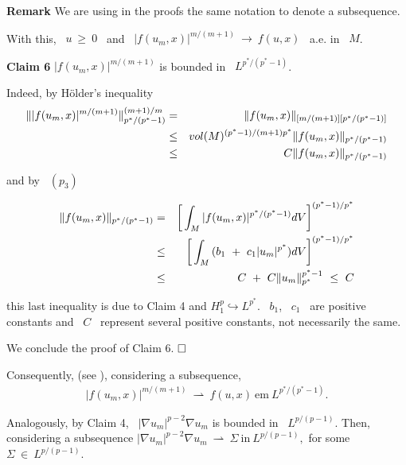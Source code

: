 \documentclass[12pt]{article}
\begin{document}
{\bf Remark}
We are using in the proofs the same notation to denote a subsequence.

With this, \ $u \ \geq \ 0$ \ and \ $|f(u_m,x)|^{m/(m+1)} \ \longrightarrow \ f(u,x)$ \ a.e. in \ $M$.

{\bf Claim 6}
$|f(u_m,x)|^{m/(m+1)}$ is bounded in \ $L^{p^{\ast}/(p^{\ast}-1)}$.

Indeed, by Hölder's inequality 
\vspace{-0.5mm}
\begin{eqnarray*}
{\displaystyle}\| |f(u_m,x)|^{m/(m+1)}\|^{(m+1)/m}_{p^{\ast}/(p^{\ast}-1)} & = & {\displaystyle}\| f(u_m,x)\|_{[m/(m+1)][p^{\ast}/(p^{\ast}-1)]} \\
 & \leq & vol(M)^{(p^{\ast} - 1)/(m + 1)p^{\ast}} {\displaystyle}\| f(u_m,x)\|_{p^{\ast}/(p^{\ast}-1)} \\
 & \leq & C {\displaystyle}\| f(u_m,x)\|_{p^{\ast}/(p^{\ast}-1)}
\end{eqnarray*} 

\noindent  and by \ $(p_3)$
\vspace{-1cm}

\begin{eqnarray*}
{\displaystyle}\| f(u_m,x)\|_{p^{\ast}/(p^{\ast}-1)} & = & \left[{\displaystyle}\int_M{|f(u_m,x)|^{p^{\ast}/(p^{\ast}-1)}dV}\right]^{(p^{\ast}-1)/p^{\ast}} \\
 & \leq & \left[{\displaystyle}\int_M{(b_1 \ + \ c_1|u_m|^{p^{\ast}})dV}\right]^{(p^{\ast}-1)/p^{\ast}} \\
 & \leq & C \ + \ C\|u_m\|^{p^{\ast}-1}_{p^{\ast}} \ \leq \ C
\end{eqnarray*}

\noindent  this last inequality is due to Claim 4 and  $H^p_1
  \hookrightarrow  L^{p^{\ast}}$. \ $b_1$, \ $c_1$ \ are  positive constants and \ $C$ \ represent several
 positive constants, not necessarily the same.

We conclude the proof of Claim 6. {$\hfill{\Box}$}
{\vspace{0.2cm}}

Consequently, (see \cite{aubin4}),  considering a subsequence, 
\vspace{-0.5mm}
\begin{eqnarray}
\label{2.10}
|f(u_m,x)|^{m/(m+1)} \ \rightharpoonup \ f(u,x) \ \mbox{em} \ L^{p^{\ast}/(p^{\ast}-1)}. 
\end{eqnarray}

Analogously, by Claim 4, \ $|\nabla u_m|^{p-2}\nabla u_m$ is bounded in \ $L^{p/(p-1)}$. Then, considering a subsequence
$|\nabla u_m|^{p-2}\nabla u_m \ \rightharpoonup \ \Sigma  \ \mbox{in} \ L^{p/(p-1)},$ for some \ $\Sigma \ \in \ L^{p/(p-1)}$.
{\vspace{0.2cm}}
\end{document}
